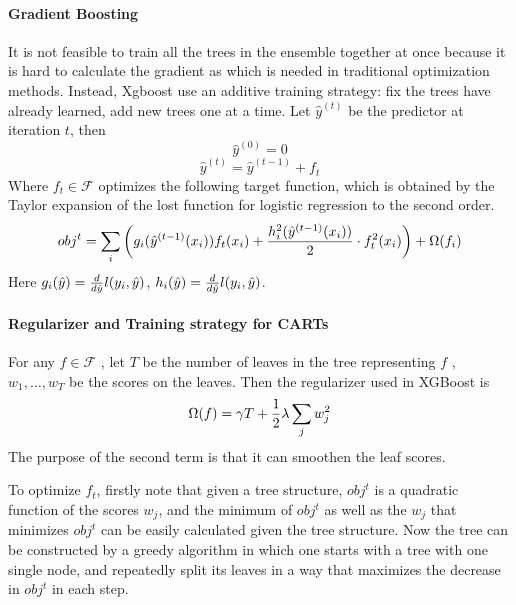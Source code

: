 \documentclass[11pt]{article}
\theoremstyle{plain}
\theoremstyle{definition}
\theoremstyle{remark}
\begin{document}
\paragraph{Gradient Boosting}
It is not feasible to train all the trees in the ensemble together at once because it is hard to calculate the gradient as which is needed in traditional optimization methods. Instead, Xgboost use an additive training strategy: fix the trees have already learned, add new trees one at a time. Let $\hat{y}^{(t)}$ be the
predictor at iteration $t$, then
\begin{equation}
\hat{y}^{(0)}=0
\end{equation}
\begin{equation}
\hat{y}^{(t)}=\hat{y}^{(t-1)}+f_t
\end{equation}
Where $f_t\in\mathcal{F}$ optimizes the following target function, which is obtained by the Taylor expansion of the lost function for logistic regression to the second order.
\begin{equation}
obj^t=\sum_i\left(g_i(\hat{y}^{(t-1)}(x_i))f_t(x_i)+{h_i^2(\hat{y}^{(t-1)}(x_i))\over 2}\cdot f_t^2(x_i)\right)+\Omega(f_i)
\end{equation}
Here $g_i(\hat{y})={d\over d\hat{y}}l(y_i,\hat{y})$, $h_i(\hat{y})={d\over d\hat{y}}l(y_i,\hat{y})$.

\paragraph{Regularizer and Training strategy for CARTs}

For any $f\in\mathcal{F}$ , let $T$ be the number of leaves in the tree representing $f$ , $w_1,\dots, w_T$ be the scores on
the leaves. Then the regularizer used in XGBoost is
\begin{equation}
\Omega(f)=\gamma T+{1\over 2}\lambda\sum_j w_j^2
\end{equation}
The purpose of the second term is that it can smoothen the leaf scores.

To optimize $f_t$, firstly note that given a tree structure, $obj^t$ is a quadratic function of the scores $w_j$,
and the minimum of $obj^t$ as well as the $w_j$ that minimizes $obj^t$ can be easily calculated given the tree structure. Now the tree can be constructed by a greedy algorithm in which one starts with a tree with
one single node, and repeatedly split its leaves in a way that maximizes the decrease in $obj^t$ in each step.

\end{document}
